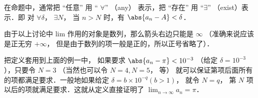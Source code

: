 在命题中，通常把 “任意” 用 “ $\forall$” （any） 表示，把 “存在” 用 “$\exists $” （exist）表示．即
对 $\forall \delta$， $\exists N$， 当 $n>N$ 时，有 $\abs{a_n - A} < \delta$． 

由于以上讨论中 lim 作用的对象是数列，那么箭头右边只能是 $\infty$ （准确来说应该是正无穷 $+\infty$， 但是由于数列的项一般是正的，所以正号省略了）．

把定义套用到上面的例一中， 如果要求 $\abs{a_n - \pi} < 10^{ - 3}$ （给定 $\delta  = {10^{ - 3}}$），只要令 $N=3$ （当然也可以令 $N=4, N=5$， 等） 就可以保证第项后面所有的项都满足要求．一般地如果给定 $\delta  = b \times 10^{ - q}  (b > 1)$， 就令 $N = q$， 第 $N$ 项以后的项就满足要求．这就从定义直接证明了 $\lim_{n \to \infty } a_n = \pi$． 

